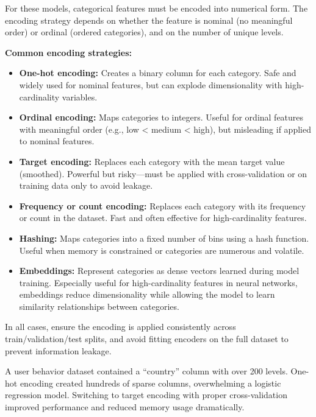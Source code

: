 \documentclass[12pt,openany]{book}
\begin{document}
For these models, categorical features must be encoded into numerical form. The encoding strategy depends on whether the feature is nominal (no meaningful order) or ordinal (ordered categories), and on the number of unique levels. \newline

\textbf{Common encoding strategies:}
\begin{itemize}
    \item \textbf{One-hot encoding:} Creates a binary column for each category. Safe and widely used for nominal features, but can explode dimensionality with high-cardinality variables.
    \item \textbf{Ordinal encoding:} Maps categories to integers. Useful for ordinal features with meaningful order (e.g., low < medium < high), but misleading if applied to nominal features.
    \item \textbf{Target encoding:} Replaces each category with the mean target value (smoothed). Powerful but risky—must be applied with cross-validation or on training data only to avoid leakage.
    \item \textbf{Frequency or count encoding:} Replaces each category with its frequency or count in the dataset. Fast and often effective for high-cardinality features.
    \item \textbf{Hashing:} Maps categories into a fixed number of bins using a hash function. Useful when memory is constrained or categories are numerous and volatile.
    \item \textbf{Embeddings:} Represent categories as dense vectors learned during model training. Especially useful for high-cardinality features in neural networks, embeddings reduce dimensionality while allowing the model to learn similarity relationships between categories.
\end{itemize}

In all cases, ensure the encoding is applied consistently across train/validation/test splits, and avoid fitting encoders on the full dataset to prevent information leakage. \newline

\begin{examplebox}
A user behavior dataset contained a “country” column with over 200 levels. One-hot encoding created hundreds of sparse columns, overwhelming a logistic regression model. Switching to target encoding with proper cross-validation improved performance and reduced memory usage dramatically.
\end{examplebox}
\end{document}
